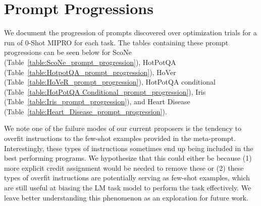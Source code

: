 \section{Prompt Progressions} We document the progression of prompts discovered over optimization trials for a run of 0-Shot MIPRO for each task. The tables containing these prompt progressions can be seen below for ScoNe (Table~\ref{table:ScoNe_prompt_progression}), HotPotQA (Table~\ref{table:HotpotQA_prompt_progression}), HoVer (Table~\ref{table:HoVeR_prompt_progression}), HotPotQA conditional (Table~\ref{table:HotPotQA Conditional_prompt_progression}), Iris (Table~\ref{table:Iris_prompt_progression}), and Heart Disease (Table~\ref{table:Heart_Disease_prompt_progression}).

We note one of the failure modes of our current proposers is the tendency to overfit instructions to the few-shot examples provided in the meta-prompt. Interestingly, these types of instructions sometimes end up being included in the best performing programs. We hypothesize that this could either be because (1) more explicit credit assignment would be needed to remove these or (2) these types of overfit instructions are potentially serving as few-shot examples, which are still useful at biasing the LM task model to perform the task effectively. We leave better understanding this phenomenon as an exploration for future work.


